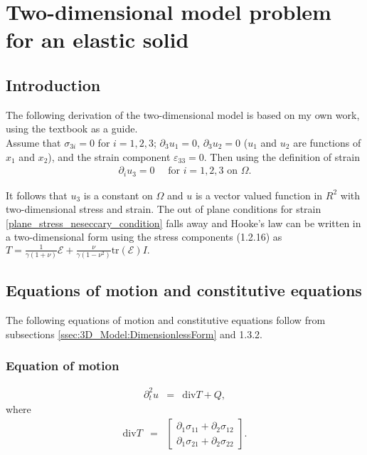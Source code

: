 \documentclass[../../main.tex]{subfiles}
\begin{document}
\section{Two-dimensional model problem for an elastic solid} \label{sec:2D_Model}
\subsection{Introduction}
The following derivation of the two-dimensional model is based on my own work, using the textbook \cite{Sadd05} as a guide.\\

Assume that $\sigma_{3i} = 0$ for $i = 1, 2, 3$; $\partial_3 u_1 = 0$, $\partial_3 u_2 = 0$ ($u_1$ and $u_2$ are functions of $x_1$ and $x_2$), and the strain component $\varepsilon_{33} = 0$. Then using the definition of strain 
\begin{eqnarray}
	\partial_i u_3 = 0 \quad \textrm{ for } i = 1,2,3 \textrm{ on } \Omega.
\end{eqnarray}

It follows that $u_3$ is a constant on $\Omega$ and $u$ is a vector valued function in $R^2$ with two-dimensional stress and strain. The out of plane conditions for strain \eqref{plane_stress_neseccary_condition} falls away and Hooke’s law can be written in a two-dimensional form using the stress components (1.2.16) as $\displaystyle T = \frac{1}{\gamma(1+\nu)}\mathcal{E} + \frac{\nu}{\gamma(1-\nu^2)}\textrm{tr}(\mathcal{E})I.$\\


\subsection{Equations of motion and constitutive equations}\label{ssec:2D_Model:EquationsOfMotion+ConstitutiveEquations}
 The following equations of motion and constitutive equations follow from subsections \ref{ssec:3D_Model:DimensionlessForm} and 1.3.2.
\subsubsection{Equation of motion}\label{sssec:2D_Model:EquationOfMotion}
\begin{eqnarray}
	\partial_t^2 u & = & \textrm{div}T + Q, \label{eq:2D_Model:EM}
\end{eqnarray}
where
\begin{eqnarray}
	\textrm{div} T & = &
	\begin{bmatrix}
		\partial_1 \sigma_{11} + \partial_2 \sigma_{12} \\
		\partial_1 \sigma_{21} + \partial_2 \sigma_{22}
	\end{bmatrix}. \label{eq:2D_Model:DivT}
\end{eqnarray}
\end{document}

